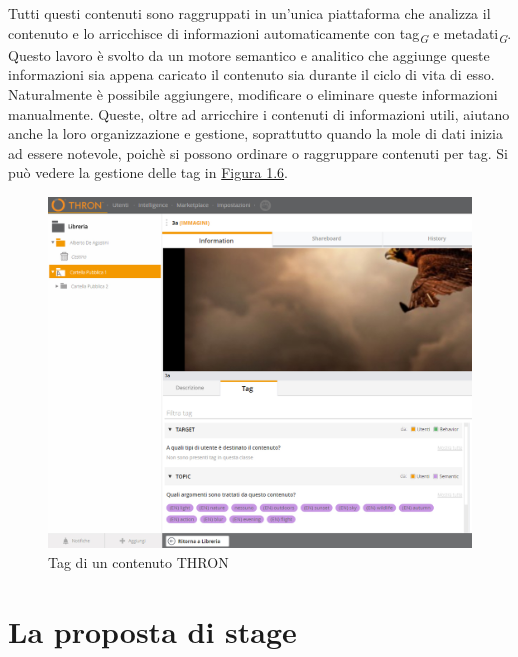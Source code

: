 \documentclass[a4paper, 12pt, twoside, openright]{book}
\newcommand{\gloss}[1]{#1\textsubscript{\textit{\tiny{G}}}}
\begin{document}
Tutti questi contenuti sono raggruppati in un'unica piattaforma che analizza il contenuto e lo arricchisce di informazioni automaticamente con \gloss{tag} e \gloss{metadati}. Questo lavoro è svolto da un motore semantico e analitico che aggiunge queste informazioni sia appena caricato il contenuto sia durante il ciclo di vita di esso. Naturalmente è possibile aggiungere, modificare o eliminare queste informazioni manualmente. Queste, oltre ad arricchire i contenuti di informazioni utili, aiutano anche la loro organizzazione e gestione, soprattutto quando la mole di dati inizia ad essere notevole, poichè si possono ordinare o raggruppare contenuti per tag. Si può vedere la gestione delle tag in \hyperref[content-tags]{Figura 1.6}.
\begin{figure}[H]
	\centering
	\label{content-tags}
	\includegraphics[width=1.0\textwidth]{images/content-tags.jpg}
	\caption{Tag di un contenuto THRON}
\end{figure}

\chapter{La proposta di stage}
\end{document}
